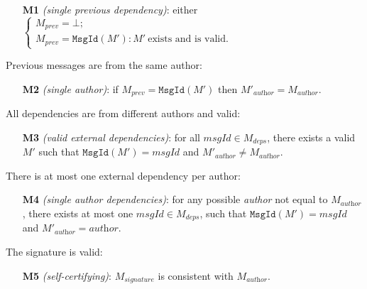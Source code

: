 \documentclass[9pt, oneside]{article}   	%
\begin{document}
\begin{tcolorbox}
\begin{enumerate}
	\item[\textbf{M1}] \textit{(single previous dependency)}: either $\begin{cases}
		M_\textit{prev} = \bot; \\
		M_\textit{prev} = \texttt{MsgId}(M') : M' ~\text{exists and is valid}.
		\end{cases}$ \\
\end{enumerate}
\end{tcolorbox}


Previous messages are from the same author:
\begin{tcolorbox}
\begin{enumerate}
	\item[\textbf{M2}] \textit{(single author)}: if $M_\textit{prev} = \texttt{MsgId}(M')$ then $M'_\textit{author} = M_\textit{author}$.
\end{enumerate}
\end{tcolorbox}

All dependencies are from different authors and valid:
\begin{tcolorbox}
\begin{enumerate}
	\item[\textbf{M3}] \textit{(valid external dependencies)}: for all $\textit{msgId} \in M_\textit{deps}$, there exists a valid $M'$ such that $\texttt{MsgId}(M') = \textit{msgId}$ and $M'_\textit{author} \neq M_\textit{author}$.
\end{enumerate}
\end{tcolorbox}

There is at most one external dependency per author:
\begin{tcolorbox}
\begin{enumerate}
	\item[\textbf{M4}] \textit{(single author dependencies)}: for any possible \textit{author} not equal to $M_\textit{author}$, there exists at most one $\textit{msgId} \in M_\textit{deps}$, such that $\texttt{MsgId}(M') = \textit{msgId}$ and $M'_\textit{author} = \textit{author}$.
\end{enumerate}
\end{tcolorbox}

The signature is valid:
\begin{tcolorbox}
\begin{enumerate}
	\item[\textbf{M5}] \textit{(self-certifying)}: $M_\textit{signature}$ is consistent with $M_\textit{author}$.
\end{enumerate}
\end{tcolorbox}
\end{document}
